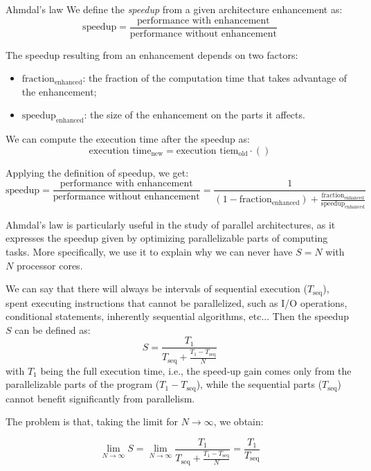 \documentclass[a4paper,11pt]{article}
\begin{document}
\begin{definition}{Ahmdal's law}
We define the \textit{speedup} from a given architecture enhancement as:
$$
\text{speedup} = \frac{\text{performance with enhancement}}{\text{performance without enhancement}}
$$
\end{definition}

The speedup resulting from an enhancement depends on two factors:
\begin{itemize}
\item $\text{fraction}_\text{enhanced}$: the fraction of the computation time that takes advantage of the enhancement;
\item $\text{speedup}_\text{enhanced}$: the size of the enhancement on the parts it affects.
\end{itemize}

We can compute the execution time after the speedup as:
$$
\text{execution time}_\text{new} = \text{execution tiem}_\text{old} \cdot \left(  \right)
$$

Applying the definition of speedup, we get:
$$
\text{speedup} = \frac{\text{performance with enhancement}}{\text{performance without enhancement}} = \frac{1}{ (1 - \text{fraction}_\text{enhanced}) + \frac{\text{fraction}_\text{enhanced}}{\text{speedup}_\text{enhanced}} }
$$

Ahmdal's law is particularly useful in the study of parallel architectures, as it expresses the speedup given by optimizing parallelizable parts of computing tasks.
More specifically, we use it to explain why we can never have $S = N$ with $N$ processor cores. 

We can say that there will always be intervals of sequential execution ($T_\text{seq}$), spent executing instructions that cannot be parallelized, such as I/O operations, conditional statements, inherently sequential algorithms, etc...
Then the speedup $S$ can be defined as:
$$
S = \frac{T_1}{T_{\text{seq}} + \frac{T_1 - T_\text{seq}}{N} }
$$
with $T_1$ being the full execution time, i.e., the speed-up gain comes only from the parallelizable parts of the program ($T_1 - T_\text{seq}$), while the sequential parts ($T_\text{seq}$) cannot benefit significantly from parallelism.

The problem is that, taking the limit for $N \rightarrow \infty$, we obtain:

$$
\lim_{N \rightarrow \infty} S =
\lim_{N \rightarrow \infty}
\frac{T_1}{T_{\text{seq}} + \frac{T_1 - T_\text{seq}}{N}}
= \frac{T_1}{T_\text{seq}}
$$
\end{document}
